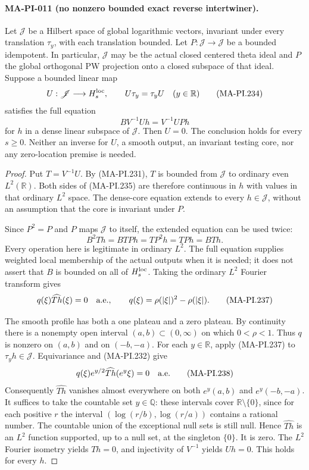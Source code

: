 \paragraph{MA-PI-011 (no nonzero bounded exact reverse intertwiner).}
Let $\mathscr J$ be a Hilbert space of global logarithmic
vectors, invariant under every translation $\tau_y$, with
each translation bounded. Let $P:\mathscr J\to\mathscr J$
be a bounded idempotent. In particular, $\mathscr J$ may be
the actual closed centered theta ideal and $P$ the global
orthogonal PW projection onto a closed subspace of that ideal.
Suppose a bounded linear map
\[
 U:\mathscr J\longrightarrow H_s^{\rm loc},\qquad
 U\tau_y=\tau_y U\quad(y\in\mathbb R)
 \tag{MA-PI.234}
\]
satisfies the full equation
\[
       B V^{-1}U h=V^{-1}U P h
 \tag{MA-PI.235}
\]
for $h$ in a dense linear subspace of $\mathscr J$.
Then $U=0$. The conclusion holds for every $s\ge0$.
Neither an inverse for $U$, a smooth output, an
invariant testing core, nor any zero-location premise is needed.

\begin{proof}
Put $T=V^{-1}U$. By (MA-PI.231), $T$ is bounded from
$\mathscr J$ to ordinary even $L^2(\mathbb R)$. Both sides
of (MA-PI.235) are therefore continuous in $h$ with values
in that ordinary $L^2$ space. The dense-core equation extends
to every $h\in\mathscr J$, without an assumption that the
core is invariant under $P$.

Since $P^2=P$ and $P$ maps $\mathscr J$ to itself, the
extended equation can be used twice:
\[
       B^2Th=BTP h=TP^2h=TP h=BTh.
 \tag{MA-PI.236}
\]
Every operation here is legitimate in ordinary $L^2$.
The full equation supplies weighted local membership of
the actual outputs when it is needed; it does not assert
that $B$ is bounded on all of $H_s^{\rm loc}$.
Taking the ordinary $L^2$ Fourier transform gives
\[
       q(\xi)\widehat{Th}(\xi)=0\quad\hbox{a.e.},\qquad
       q(\xi)=\rho(|\xi|)^2-\rho(|\xi|).
 \tag{MA-PI.237}
\]

The smooth profile has both a one plateau and a zero
plateau. By continuity there is a nonempty open interval
$(a,b)\subset(0,\infty)$ on which $0<\rho<1$.
Thus $q$ is nonzero on $(a,b)$ and on $(-b,-a)$.
For each $y\in\mathbb R$, apply (MA-PI.237) to
$\tau_yh\in\mathscr J$. Equivariance and (MA-PI.232)
give
\[
       q(\xi)e^{y/2}\widehat{Th}(e^y\xi)=0
                                      \quad\hbox{a.e.}
 \tag{MA-PI.238}
\]
Consequently $\widehat{Th}$ vanishes almost everywhere
on both $e^y(a,b)$ and $e^y(-b,-a)$.
It suffices to take the countable set $y\in\mathbb Q$:
these intervals cover $\mathbb R\setminus\{0\}$, since
for each positive $r$ the interval
$(\log(r/b),\log(r/a))$ contains a rational number.
The countable union of the exceptional null sets is still
null. Hence $\widehat{Th}$ is an $L^2$ function supported,
up to a null set, at the singleton $\{0\}$. It is zero.
The $L^2$ Fourier isometry yields $Th=0$, and injectivity
of $V^{-1}$ yields $Uh=0$. This holds for every $h$.
\end{proof}

